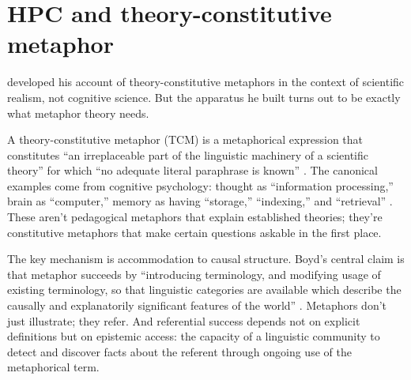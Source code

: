 \documentclass[12pt]{article}
\begin{document}
\section{HPC and theory-constitutive metaphor}
\label{sec:hpc-tcm}

\textcite{boyd1979} developed his account of theory-constitutive metaphors in the context of scientific realism, not cognitive science. But the apparatus he built turns out to be exactly what metaphor theory needs.

A theory-constitutive metaphor (TCM) is a metaphorical expression that constitutes \enquote{an irreplaceable part of the linguistic machinery of a scientific theory} for which \enquote{no adequate literal paraphrase is known} \citep[482]{boyd1979}. The canonical examples come from cognitive psychology: thought as \enquote{information processing,} brain as \enquote{computer,} memory as having \enquote{storage,} \enquote{indexing,} and \enquote{retrieval} \citep[486--487]{boyd1979}. These aren't pedagogical metaphors that explain established theories; they're constitutive metaphors that make certain questions askable in the first place.

The key mechanism is accommodation to causal structure. Boyd's central claim is that metaphor succeeds by \enquote{introducing terminology, and modifying usage of existing terminology, so that linguistic categories are available which describe the causally and explanatorily significant features of the world} \citep[483]{boyd1979}. Metaphors don't just illustrate; they refer. And referential success depends not on explicit definitions but on epistemic access: the capacity of a linguistic community to detect and discover facts about the referent through ongoing use of the metaphorical term.
\end{document}
